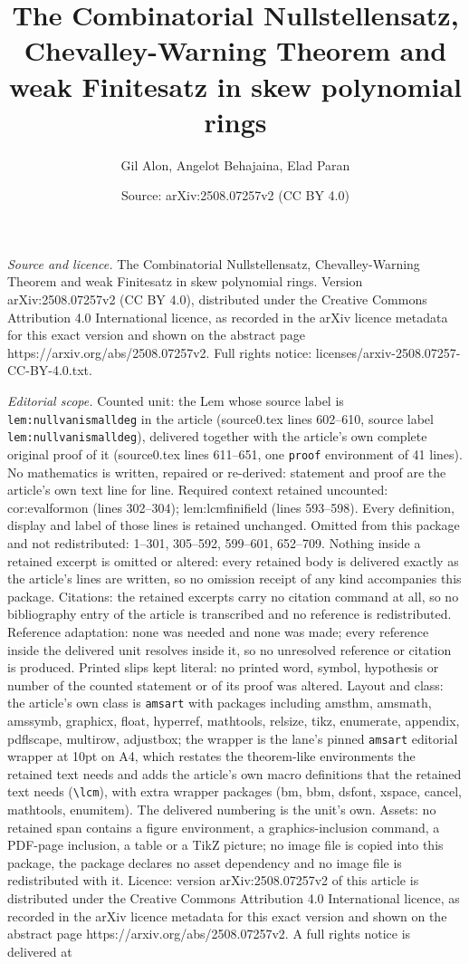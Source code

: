 \documentclass[10pt,a4paper]{amsart}
\title[The Combinatorial Nullstellensatz, Chevalley-Warning Theorem]{The Combinatorial Nullstellensatz, Chevalley-Warning Theorem and weak Finitesatz in skew polynomial rings}
\author{Gil Alon, Angelot Behajaina, Elad Paran}
\date{Source: arXiv:2508.07257v2 (CC BY 4.0)}
\begin{document}
\maketitle

\noindent\emph{Source and licence.} The Combinatorial Nullstellensatz, Chevalley-Warning Theorem and weak Finitesatz in skew polynomial rings. Version arXiv:2508.07257v2 (CC BY 4.0), distributed under the Creative Commons Attribution 4.0 International licence, as recorded in the arXiv licence metadata for this exact version and shown on the abstract page https://arxiv.org/abs/2508.07257v2. Full rights notice: licenses/arxiv-2508.07257-CC-BY-4.0.txt.\par\smallskip

\noindent\textit{Editorial scope.} Counted unit: the Lem whose source label is \texttt{lem:nullvanismalldeg} in the article (source0.tex lines 602--610, source label \texttt{lem:nullvanismalldeg}), delivered together with the article's own complete original proof of it (source0.tex lines 611--651, one \texttt{proof} environment of 41 lines). No mathematics is written, repaired or re-derived: statement and proof are the article's own text line for line. Required context retained uncounted: cor:evalformon (lines 302--304); lem:lcmfinifield (lines 593--598). Every definition, display and label of those lines is retained unchanged. Omitted from this package and not redistributed: 1--301, 305--592, 599--601, 652--709. Nothing inside a retained excerpt is omitted or altered: every retained body is delivered exactly as the article's lines are written, so no omission receipt of any kind accompanies this package. Citations: the retained excerpts carry no citation command at all, so no bibliography entry of the article is transcribed and no reference is redistributed. Reference adaptation: none was needed and none was made; every reference inside the delivered unit resolves inside it, so no unresolved reference or citation is produced. Printed slips kept literal: no printed word, symbol, hypothesis or number of the counted statement or of its proof was altered. Layout and class: the article's own class is \texttt{amsart} with packages including amsthm, amsmath, amssymb, graphicx, float, hyperref, mathtools, relsize, tikz, enumerate, appendix, pdflscape, multirow, adjustbox; the wrapper is the lane's pinned \texttt{amsart} editorial wrapper at 10pt on A4, which restates the theorem-like environments the retained text needs and adds the article's own macro definitions that the retained text needs (\texttt{\textbackslash lcm}), with extra wrapper packages (bm, bbm, dsfont, xspace, cancel, mathtools, enumitem). The delivered numbering is the unit's own. Assets: no retained span contains a figure environment, a graphics-inclusion command, a PDF-page inclusion, a table or a TikZ picture; no image file is copied into this package, the package declares no asset dependency and no image file is redistributed with it. Licence: version arXiv:2508.07257v2 of this article is distributed under the Creative Commons Attribution 4.0 International licence, as recorded in the arXiv licence metadata for this exact version and shown on the abstract page https://arxiv.org/abs/2508.07257v2. A full rights notice is delivered at 
\end{document}
